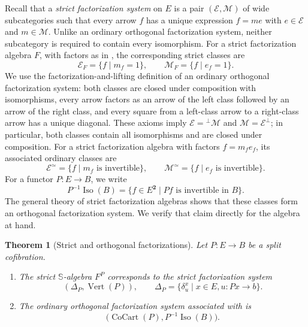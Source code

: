 \documentclass[11pt]{article}
\theoremstyle{plain}
\newtheorem{theorem}{Theorem}[section]
\theoremstyle{definition}
\theoremstyle{remark}
\newcommand{\CoCart}{\operatorname{CoCart}}
\newcommand{\Vrt}{\operatorname{Vert}}
\newcommand{\Iso}{\operatorname{Iso}}
\newcommand{\Sq}{\mathbb{S}}
\numberwithin{equation}{section}
\begin{document}
Recall that a \emph{strict factorization system} on $E$ is a pair
$(\mathcal E,\mathcal M)$ of wide subcategories such that every arrow
$f$ has a unique expression $f=me$ with $e\in\mathcal E$ and
$m\in\mathcal M$.  Unlike an ordinary orthogonal factorization
system, neither subcategory is required to contain every isomorphism.
For a strict factorization algebra $F$, with factors as in
, the corresponding strict classes are
\begin{equation}
  \mathcal E_F=\{f\mid m_f=1\},
  \qquad
  \mathcal M_F=\{f\mid e_f=1\}.
  \label{eq:strict-classes}
\end{equation}
We use the factorization-and-lifting definition of an ordinary
orthogonal factorization system: both classes are closed under
composition with isomorphisms, every arrow factors as an arrow of the
left class followed by an arrow of the right class, and every square
from a left-class arrow to a right-class arrow has a unique diagonal.
These axioms imply
$\mathcal E={}^{\perp}\mathcal M$ and
$\mathcal M=\mathcal E^{\perp}$; in particular, both classes contain
all isomorphisms and are closed under composition.
For a strict factorization algebra with factors $f=m_fe_f$, its
associated ordinary classes are
\begin{equation}
  \mathcal E^{\simeq}=\{f\mid m_f\text{ is invertible}\},
  \qquad
  \mathcal M^{\simeq}=\{f\mid e_f\text{ is invertible}\}.
  \label{eq:ordinary-classes}
\end{equation}
For a functor $P\colon E\to B$, we write
\begin{equation*}
  P^{-1}\Iso(B)
  =\{f\in E^{\mathbf 2}\mid Pf\text{ is invertible in }B\}.
\end{equation*}
The general theory of strict factorization algebras shows that these
classes form an orthogonal factorization system.  We verify that claim
directly for the algebra at hand.

\begin{theorem}[Strict and orthogonal factorizations]
\label{thm:factorization-comparison}
Let $P\colon E\to B$ be a split cofibration.
\begin{enumerate}[label=\textup{(\roman*)},leftmargin=2.2em]
\item The strict $\Sq$-algebra $F^{P}$ corresponds to the strict
      factorization system
      \begin{equation}
        (\Delta_P,\Vrt(P)),
        \qquad
        \Delta_P=
        \{\delta^{x}_{u}\mid x\in E, u\colon Px\to b\}.
        \label{eq:strict-fs}
\end{equation}
\item The ordinary orthogonal factorization system associated with
       is
      \begin{equation}
        \bigl(\CoCart(P),P^{-1}\Iso(B)\bigr).
        \label{eq:ordinary-fs}
\end{equation}
\end{enumerate}
\end{theorem}
\end{document}
